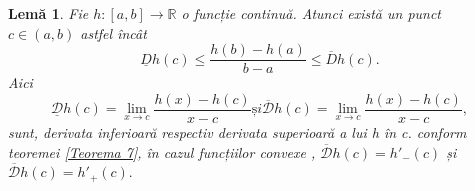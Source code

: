 \documentclass[a4paper,12pt,oneside]{report}
\newtheorem{lemma}{Lem\u{a}}
\begin{document}
\begin{lemma} \label{Lema 3} 
Fie \(h : \left [ a,b\right ]\rightarrow \mathbb{R}\) o funcție continuă. Atunci există un punct \(c \in \left ( a,b \right )\) astfel încât 
\begin{displaymath}
   \underline{D}h\left ( c \right ) \leq  \frac{h\left ( b \right ) - h\left ( a \right )}{b-a}\leq \overline{D}h\left ( c \right ).
\end{displaymath}
Aici 
\begin{displaymath}
   \underline{\mathcal{D}}h\left ( c \right ) = \lim_{x\rightarrow c}  \frac{h\left ( x \right ) - h\left ( c \right )}{x-c} și \overline{\mathcal{D}}h\left ( c \right ) = \lim_{x\rightarrow c}  \frac{h\left ( x \right ) - h\left ( c \right )}{x-c}, 
\end{displaymath}
sunt, derivata inferioară respectiv derivata superioară a lui h în c. conform teoremei \ref{Teorema 7}, în cazul funcțiilor convexe , \(\overline{\mathcal{D}}h\left ( c \right ) = {h}'_{-}\left ( c \right )\)  și   \(\overline{\mathcal{D}}h\left ( c \right )  = {h}'_{+}\left ( c \right ).\) 
\end{lemma}
\end{document}
